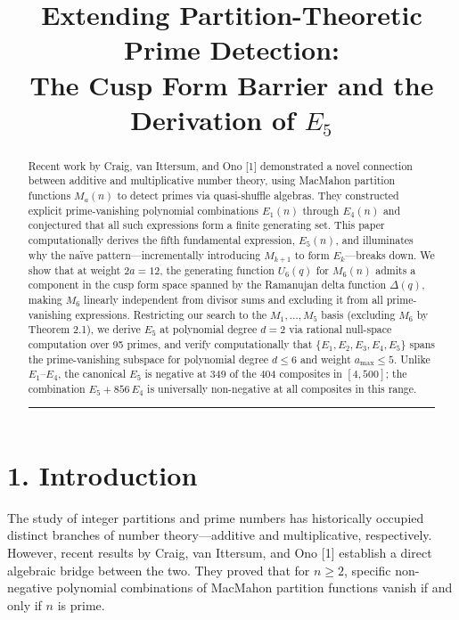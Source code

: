 \documentclass[
  11pt,
]{article}
\title{Extending Partition-Theoretic Prime Detection:\\
The Cusp Form Barrier and the Derivation of \(E_5\)}
\author{}
\date{}
\begin{document}
\maketitle

\begin{abstract}

Recent work by Craig, van Ittersum, and Ono {[}1{]} demonstrated a novel
connection between additive and multiplicative number theory, using
MacMahon partition functions \(M_a(n)\) to detect primes via
quasi-shuffle algebras. They constructed explicit prime-vanishing
polynomial combinations \(E_1(n)\) through \(E_4(n)\) and conjectured
that all such expressions form a finite generating set. This paper
computationally derives the fifth fundamental expression, \(E_5(n)\),
and illuminates why the naïve pattern---incrementally introducing
\(M_{k+1}\) to form \(E_k\)---breaks down. We show that at weight
\(2a=12\), the generating function \(U_6(q)\) for \(M_6(n)\) admits a
component in the cusp form space spanned by the Ramanujan delta function
\(\Delta(q)\), making \(M_6\) linearly independent from divisor sums and
excluding it from all prime-vanishing expressions. Restricting our
search to the \(M_1,\ldots,M_5\) basis (excluding \(M_6\) by Theorem
2.1), we derive \(E_5\) at polynomial degree \(d=2\) via rational
null-space computation over 95 primes, and verify computationally that
\(\{E_1, E_2, E_3, E_4, E_5\}\) spans the prime-vanishing subspace for
polynomial degree \(d \leq 6\) and weight \(a_{\max} \leq 5\). Unlike
\(E_1\)--\(E_4\), the canonical \(E_5\) is negative at 349 of the 404
composites in \([4,500]\); the combination \(E_5 + 856\,E_4\) is
universally non-negative at all composites in this range.

\begin{center}\rule{0.5\linewidth}{0.5pt}\end{center}

\end{abstract}

\section{1. Introduction}\label{introduction}

The study of integer partitions and prime numbers has historically
occupied distinct branches of number theory---additive and
multiplicative, respectively. However, recent results by Craig, van
Ittersum, and Ono {[}1{]} establish a direct algebraic bridge between
the two. They proved that for \(n \geq 2\), specific non-negative
polynomial combinations of MacMahon partition functions vanish if and
only if \(n\) is prime.
\end{document}
